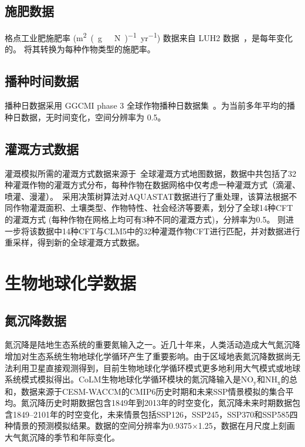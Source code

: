 \subsection{施肥数据}\label{施肥数据}
格点工业肥施肥率 (\unit{m^2.(g\ N)^{-1}.yr^{-1}}) 数据来自 LUH2 数据~\citep{hurtt2011harmonization}，是每年变化的。\citet{lawrence2016land} 将其转换为每种作物类型的施肥率。

\subsection{播种时间数据}\label{播种时间数据}
播种日数据采用 GGCMI phase 3 全球作物播种日数据集~\citep{jagermeyr2021climate}。为当前多年平均的播种日数据，无时间变化，空间分辨率为 0.5\textdegree。

\subsection{灌溉方式数据}\label{灌溉方式数据}
灌溉模拟所需的灌溉方式数据来源于~\citet{yao2022Irrigation}全球灌溉方式地图数据，数据中共包括了32种灌溉作物的灌溉方式分布，每种作物在数据网格中仅考虑一种灌溉方式（滴灌、喷灌、漫灌）。~\citet{jagermeyr2015irrigation}采用决策树算法对AQUASTAT数据\citep{fao2014aquastat}进行了重处理，该算法根据不同作物灌溉面积、土壤类型、作物特性、社会经济等要素，划分了全球14种CFT的灌溉方式 (每种作物在网格上均可有3种不同的灌溉方式)，分辨率为0.5\textdegree。\citet{yao2022Irrigation} 则进一步将该数据中14种CFT与CLM5中的32种灌溉作物CFT进行匹配，并对数据进行重采样，得到新的全球灌溉方式数据。

\section{生物地球化学数据}

\subsection{氮沉降数据}\label{氮沉降数据}
氮沉降是陆地生态系统的重要氮输入之一。近几十年来，人类活动造成大气氮沉降增加对生态系统生物地球化学循环产生了重要影响。由于区域地表氮沉降数据尚无法利用卫星直接观测得到，目前生物地球化学循环模式更多地利用大气模式或地球系统模式模拟得出。CoLM生物地球化学循环模块的氮沉降输入是$\mathrm{NO_y}$和$\mathrm{NH_x}$的总和，数据来源于CESM-WACCM的CMIP6历史时期和未来SSP情景模拟的集合平均。氮沉降历史时期数据包含1849年到2013年的时空变化，氮沉降未来时期数据包含1849--2101年的时空变化，未来情景包括SSP126，SSP245，SSP370和SSP585四种情景的预测模拟结果。数据的空间分辨率为0.9375\textdegree$\times$1.25\textdegree，数据在月尺度上刻画大气氮沉降的季节和年际变化。


